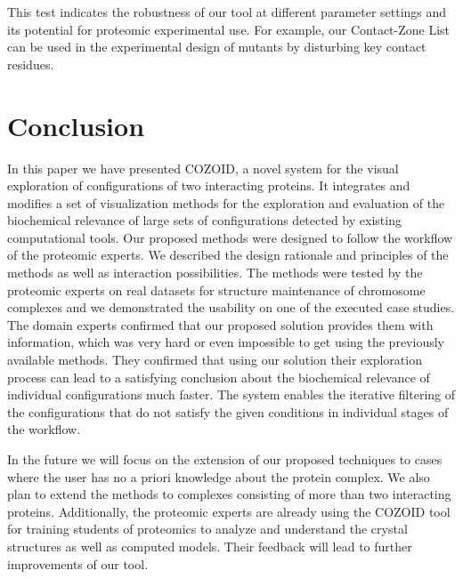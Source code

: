 \documentclass[twocolumn]{bmcart}%
\def\CoZoList{Contact-Zone List\xspace}
\begin{document}
This test indicates the robustness of our tool at different parameter settings and its potential for proteomic experimental use. 
For example, our \CoZoList can be used in the experimental design of mutants by disturbing key contact residues. 


\section{Conclusion}
In this paper we have presented COZOID, a novel system for the visual exploration of configurations of two interacting proteins. 
It integrates and modifies a set of visualization methods for the exploration and evaluation of the biochemical relevance of large sets of configurations detected by existing computational tools.
Our proposed methods were designed to follow the workflow of the proteomic experts.
We described the design rationale and principles of the methods as well as interaction possibilities. 
The methods were tested by the proteomic experts on real datasets for structure maintenance of chromosome complexes and we demonstrated the usability on one of the executed case studies.
The domain experts confirmed that our proposed solution provides them with information, which was very hard or even impossible to get using the previously available methods.
They confirmed that using our solution their exploration process can lead to a satisfying conclusion about the biochemical relevance of individual configurations much faster.
The system enables the iterative filtering of the configurations that do not satisfy the given conditions in individual stages of the workflow.

In the future we will focus on the extension of our proposed techniques to cases where the user has no a priori knowledge about the protein complex.
We also plan to extend the methods to complexes consisting of more than two interacting proteins. 
Additionally, the proteomic experts are already using the COZOID tool for training students of proteomics to analyze and understand the crystal structures as well as computed models.
Their feedback will lead to further improvements of our tool.


\end{document}
